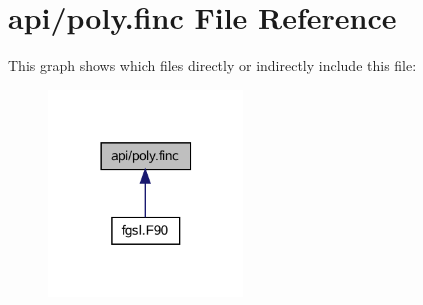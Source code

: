 \hypertarget{poly_8finc}{}\section{api/poly.finc File Reference}
\label{poly_8finc}
This graph shows which files directly or indirectly include this file\+:\nopagebreak
\begin{figure}[H]
\begin{center}
\leavevmode
\includegraphics[width=146pt]{poly_8finc__dep__incl}
\end{center}
\end{figure}
